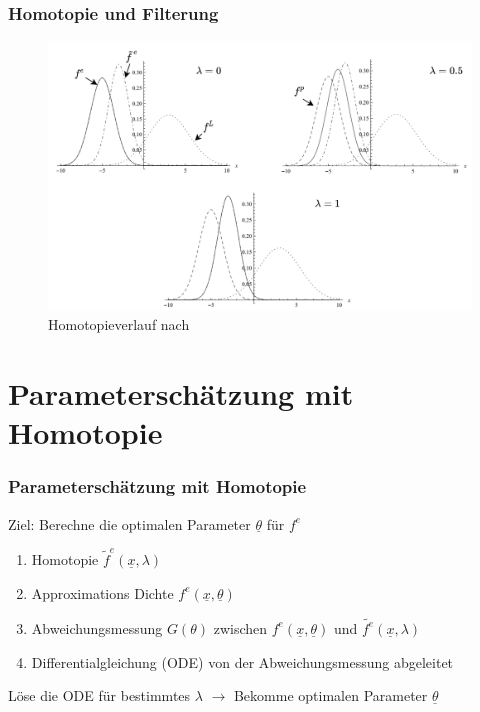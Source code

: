 \documentclass[18pt]{beamer}
\begin{document}
\begin{frame}
    \frametitle{Homotopie und Filterung}
    \begin{figure}
        \centering
        \includegraphics[scale=0.25]{pictures/homotopy_parameteroptimization.png}
        \caption{Homotopieverlauf nach \cite{hagmar2011}}
    \end{figure}
\end{frame}


\section{Parameterschätzung mit Homotopie}
\begin{frame}
    \frametitle{Parameterschätzung mit Homotopie}
    Ziel: Berechne die optimalen Parameter $\underline{\theta}$ für $f^{e}$
    \begin{enumerate}
        \item Homotopie $\tilde{f}^{e}(\underline{x},\lambda)$
        \item Approximations Dichte $f^e(\underline{x}, \underline{\theta})$ 
        \item Abweichungsmessung $G(\theta)$ zwischen $f^e(\underline{x}, \underline{\theta})$ und $\tilde{f^e}(\underline{x},\lambda)$
        \item Differentialgleichung (ODE) von der Abweichungsmessung abgeleitet
    \end{enumerate}
    \vspace{15pt}
    \centering
    Löse die ODE für bestimmtes $\lambda$ $\rightarrow$ Bekomme optimalen Parameter $\underline{\theta}$
\end{frame}
\end{document}
